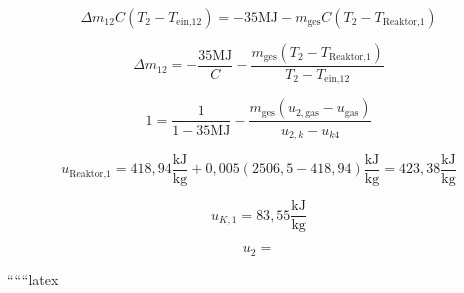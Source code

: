\[
\Delta m_{12} C \left( T_2 - T_{\text{ein,12}} \right) = -35 \text{MJ} - m_{\text{ges}} C \left( T_2 - T_{\text{Reaktor,1}} \right)
\]

\[
\Delta m_{12} = -\frac{35 \text{MJ}}{C} - \frac{m_{\text{ges}} \left( T_2 - T_{\text{Reaktor,1}} \right)}{T_2 - T_{\text{ein,12}}}
\]

\[
1 = \frac{1}{1 - 35 \text{MJ}} - \frac{m_{\text{ges}} \left( u_{2,\text{gas}} - u_{\text{gas}} \right)}{u_{2,k} - u_{k4}}
\]

\[
u_{\text{Reaktor,1}} = 418,94 \frac{\text{kJ}}{\text{kg}} + 0,005 \left( 2506,5 - 418,94 \right) \frac{\text{kJ}}{\text{kg}} = 423,38 \frac{\text{kJ}}{\text{kg}}
\]

\[
u_{K,1} = 83,55 \frac{\text{kJ}}{\text{kg}}
\]

\[
u_2 =
\]

``````latex


